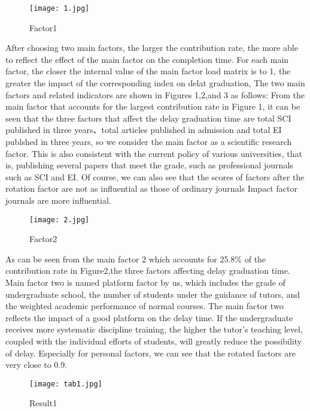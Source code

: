 \documentclass{mcmthesis}
\begin{document}
\begin{figure}[htbp]
	\centering
	\texttt{[image: 1.jpg]}
	\caption{Factor1}
	\label{fig:Factor1}
\end{figure}

After choosing two main factors, the larger the contribution rate, the more able
to reflect the effect of the main factor on the completion time. For each main
factor, the closer the internal value of the main factor load matrix is to 1,
the greater the impact of the corresponding index on delat graduation, The two
main factors and related indicators are shown in Figures 1,2,and 3 as follows:
From the main factor that accounts for the largest contribution rate in Figure
1, it can be seen that the three factors that affect the delay graduation time
are total SCI published in three years、total articles published in admission
and total EI publshed in three years, so we consider the main factor as a
scientific research factor. This is also consistent with the current policy of
various universities, that is, publishing several papers that meet the grade,
such as professional journals such as SCI and EI. Of course, we can also see
that the scores of factors after the rotation factor are not as influential as
those of ordinary journals Impact factor journals are more influential.

\begin{figure}[htbp]
	\centering
	\texttt{[image: 2.jpg]}
	\caption{Factor2}
	\label{fig:Factor2}
\end{figure}

As can be seen from the main factor 2 which accounts for 25.8\% of the
contribution rate in Figure2,the three factors affecting delay graduation time.
Main factor two is named platform factor by us, which includes the grade of
undergraduate school, the number of students under the guidance of tutors, and
the weighted academic performance of normal courses. The main factor two
reflects the impact of a good platform on the delay time. If the undergraduate
receives more systematic discipline training, the higher the tutor's teaching
level, coupled with the individual efforts of students, will greatly reduce the
possibility of delay. Especially for personal factors, we can see that the
rotated factors are very close to 0.9.

\begin{figure}[htbp]
	\centering
	\texttt{[image: tab1.jpg]}
	\caption{Result1}
	\label{fig:Result1}
\end{figure}
\end{document}
